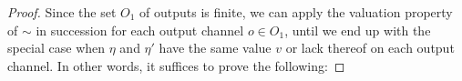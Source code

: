 \begin{proof}
 Since the set $O_1$ of outputs is finite, we can apply the valuation property of $\sim$ in succession for each output channel $o \in O_1$, until we end up with the special case when $\eta$ and $\eta'$ have the same value $v$ or lack thereof on each output channel. In other words, it suffices to prove the following:
%
%
%
%
%
%
%
%
%
%
%
%
%
%

\end{proof}
